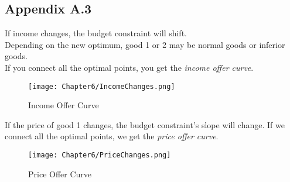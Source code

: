 \subsection*{Appendix A.3}
If income changes, the budget constraint will shift.\\
Depending on the new optimum, good 1 or 2 may be normal goods or inferior goods.\\
If you connect all the optimal points, you get the \emph{income offer curve}.
\begin{figure}[H]
    \centering
    \texttt{[image: Chapter6/IncomeChanges.png]}
    \caption{Income Offer Curve}
    \label{fig:Income_Offer_Curve}
\end{figure}
If the price of good 1 changes, the budget constraint's slope will change.
If we connect all the optimal points, we get the \emph{price offer curve}.
\begin{figure}[H]
    \centering
    \texttt{[image: Chapter6/PriceChanges.png]}
    \caption{Price Offer Curve}
    \label{fig:Price_Offer_Curve}
\end{figure}